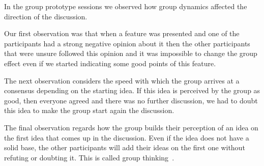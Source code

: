 \documentclass[main.tex]{subfiles}
\begin{document}

In the group prototype sessions we observed how group dynamics affected the direction of the discussion.

 Our first observation was that when a feature was presented and one of the participants had a strong negative opinion about it then the other participants that were unsure followed this opinion and it was impossible to change the group effect even if we started indicating some good points of this feature. 

The next observation considers the speed with which the group arrives at a consensus depending on the starting idea. If this idea is perceived by the group as good, then everyone agreed and there was no further discussion, we had to doubt this idea to make the group start again the discussion.

The final observation regards how the group builds their perception of an idea on the first idea that comes up in the discussion. Even if the idea does not have a solid base, the other participants will add their ideas on the first one without refuting or doubting it. This is called group thinking~\cite{}.
\end{document}
